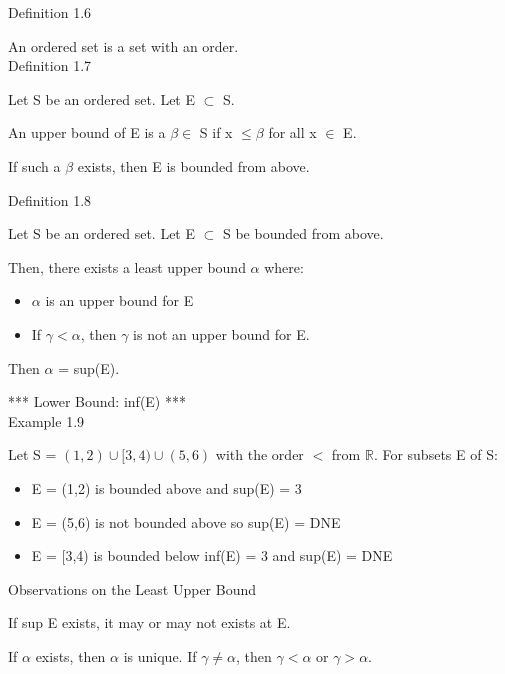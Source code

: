 { \color{blue} Definition 1.6 }

\qquad An ordered set is a set with an order. \\

{ \color{blue} Definition 1.7 }

\qquad Let S be an ordered set. Let E $ \subset $ S.

\qquad An upper bound of E is a $ \beta \in $ S if x $ \leq \beta $ for all x $ \in $ E.

\qquad If such a $ \beta $ exists, then E is bounded from above. \\

\newpage

{ \color{blue} Definition 1.8 }

\qquad Let S be an ordered set. Let E $ \subset $ S be bounded from above.

\qquad Then, there exists a least upper bound $ \alpha $ where:

\begin{itemize}[leftmargin=2cm]
	\item $ \alpha $ is an upper bound for E
	\item If $ \gamma < \alpha $, then $ \gamma $ is not an upper bound for E.
\end{itemize}

\qquad Then $ \alpha $ = sup(E).

*** Lower Bound: inf(E) *** \\

{ \color{red} Example 1.9 }

\qquad Let S = $ (1,2) \cup [3,4) \cup (5,6) $ with the order $ < $ from $ \mathbb{R} $.
For subsets E of S:

\begin{itemize}[leftmargin=2cm]
	\item E = (1,2) is bounded above and sup(E) = 3
	\item E = (5,6) is not bounded above so sup(E) = DNE
	\item E = [3,4) is bounded below inf(E) = 3 and sup(E) = DNE
\end{itemize}

{ \color{green} Observations on the Least Upper Bound }

\qquad If sup E exists, it may or may not exists at E.

\qquad If $ \alpha $ exists, then $ \alpha $ is unique.
If $ \gamma \neq \alpha $, then $ \gamma < \alpha $ or $ \gamma > \alpha $. \\

